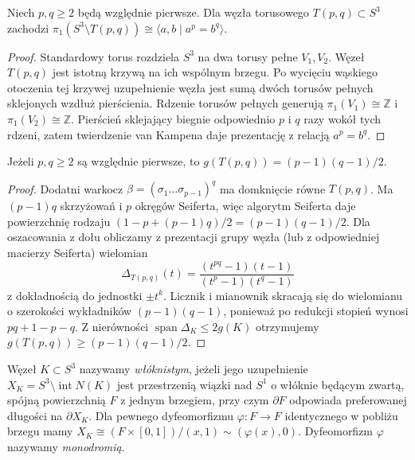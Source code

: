 \begin{twierdzenie}
Niech $p,q\geq2$ będą względnie pierwsze. Dla węzła torusowego
$T(p,q)\subset S^3$ zachodzi
$\pi_1(S^3\setminus T(p,q))\cong
\langle a,b\mid a^p=b^q\rangle$.
\end{twierdzenie}

\begin{proof}
Standardowy torus rozdziela $S^3$ na dwa torusy pełne
$V_1,V_2$. Węzeł $T(p,q)$ jest istotną krzywą na ich wspólnym
brzegu. Po wycięciu wąskiego otoczenia tej krzywej
uzupełnienie węzła jest sumą dwóch torusów pełnych sklejonych
wzdłuż pierścienia. Rdzenie torusów pełnych generują
$\pi_1(V_1)\cong\mathbb Z$ i $\pi_1(V_2)\cong\mathbb Z$.
Pierścień sklejający biegnie odpowiednio $p$ i $q$ razy
wokół tych rdzeni, zatem twierdzenie van Kampena daje
prezentację z relacją $a^p=b^q$.
\end{proof}

\begin{twierdzenie}
Jeżeli $p,q\geq2$ są względnie pierwsze, to
$g(T(p,q))=(p-1)(q-1)/2$.
\end{twierdzenie}

\begin{proof}
Dodatni warkocz $\beta=(\sigma_1\dots\sigma_{p-1})^q$
ma domknięcie równe $T(p,q)$. Ma $(p-1)q$ skrzyżowań
i $p$ okręgów Seiferta, więc algorytm Seiferta daje
powierzchnię rodzaju $(1-p+(p-1)q)/2=(p-1)(q-1)/2$.
Dla oszacowania z dołu obliczamy z prezentacji grupy
węzła (lub z odpowiedniej macierzy Seiferta) wielomian
\[
\Delta_{T(p,q)}(t)=
\frac{(t^{pq}-1)(t-1)}{(t^p-1)(t^q-1)}
\]
z dokładnością do jednostki $\pm t^k$.
Licznik i mianownik skracają się do wielomianu o szerokości
wykładników $(p-1)(q-1)$, ponieważ po redukcji stopień
wynosi $pq+1-p-q$. Z nierówności
$\operatorname{span}\Delta_K\leq2g(K)$ otrzymujemy
$g(T(p,q))\geq(p-1)(q-1)/2$.
\end{proof}

\begin{definicja}
Węzeł $K\subset S^3$ nazywamy \emph{włóknistym}, jeżeli jego
uzupełnienie $X_K=S^3\setminus\operatorname{int}N(K)$
jest przestrzenią wiązki nad $S^1$ o włóknie będącym zwartą,
spójną powierzchnią $F$ z jednym brzegiem, przy czym
$\partial F$ odpowiada preferowanej długości na
$\partial X_K$. Dla pewnego dyfeomorfizmu
$\varphi\colon F\to F$ identycznego w pobliżu brzegu mamy
$X_K\cong (F\times[0,1])/(x,1)\sim(\varphi(x),0)$.
Dyfeomorfizm $\varphi$ nazywamy \emph{monodromią}.
\end{definicja}

